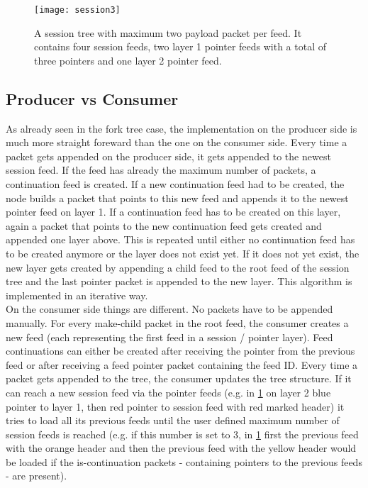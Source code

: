 \begin{figure}
\centering
\texttt{[image: session3]}
\caption{A session tree with maximum two payload packet per feed. It contains four session feeds, two layer 1 pointer feeds with a total of three pointers and one layer 2 pointer feed.}
\label{fig:session3}
\end{figure}



\subsection{Producer vs Consumer}
As already seen in the fork tree case, the implementation on the producer side is much more straight foreward than the one on the consumer side. Every time a packet gets appended on the producer side, it gets appended to the newest session feed. If the feed has already the maximum number of packets, a continuation feed is created. If a new continuation feed had to be created, the node builds a packet that points to this new feed and appends it to the newest pointer feed on layer 1. If a continuation feed has to be created on this layer, again a packet that points to the new continuation feed gets created and appended one layer above. This is repeated until either no continuation feed has to be created anymore or the layer does not exist yet. If it does not yet exist, the new layer gets created by appending a child feed to the root feed of the session tree and the last pointer packet is appended to the new layer. This algorithm is implemented in an iterative way. \cite{Thesis}\\
On the consumer side things are different. No packets have to be appended manually. For every make-child packet in the root feed, the consumer creates a new feed (each representing the first feed in a session / pointer layer). Feed continuations can either be created after receiving the pointer from the previous feed or after receiving a feed pointer packet containing the feed ID. Every time a packet gets appended to the tree, the consumer updates the tree structure. If it can reach a new session feed via the pointer feeds (e.g. in \cref{fig:session3} on layer 2 blue pointer to layer 1, then red pointer to session feed with red marked header) it tries to load all its previous feeds until the user defined maximum number of session feeds is reached (e.g. if this number is set to 3, in \cref{fig:session3} first the previous feed with the orange header and then the previous feed with the yellow header would be loaded if the is-continuation packets - containing pointers to the previous feeds - are present). \\

